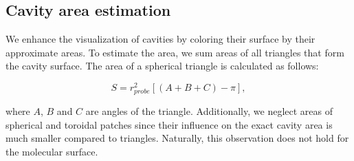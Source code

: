 \subsection{Cavity area estimation}
We enhance the visualization of cavities by coloring their surface by their approximate areas.
To estimate the area, we sum areas of all triangles that form the cavity surface.
The area of a spherical triangle is calculated as follows:

\begin{equation}
  S = r_{probe}^2 \left[ \left( A + B + C \right) - \pi \right],
\end{equation}

where $A$, $B$ and $C$ are angles of the triangle. 
Additionally, we neglect areas of spherical and toroidal patches since their influence on the exact cavity area is much smaller compared to triangles.
Naturally, this observation does not hold for the molecular surface.
